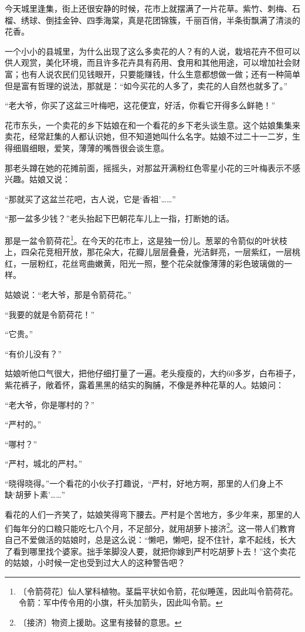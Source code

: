 \documentclass[12pt,UTF-8,openany]{ctexbook}
\begin{document}
\begin{large}
    
    今天城里逢集，街上还很安静的时候，花市上就摆满了一片花草。紫竹、刺梅、石榴、绣球、倒挂金钟、四季海棠，真是花团锦簇，千丽百俏，半条街飘满了清淡的花香。
    
    一个小小的县城里，为什么出现了这么多卖花的人？有的人说，栽培花卉不但可以供人观赏，美化环境，而且许多花卉具有药用、食用和其他用途，可以增加社会财富；也有人说农民们见钱眼开，只要能赚钱，什么生意都想做一做；还有一种简单但是富有哲理的说法，那就是：“如今买花的人多了，卖花的人自然也就多了。”
    
    “老大爷，你买了这盆三叶梅吧，这花便宜，好活，你看它开得多么鲜艳！”
    
    花市东头，一个卖花的乡下姑娘在和一个看花的乡下老头谈生意。这个姑娘集集来卖花，经常赶集的人都认识她，但不知道她叫什么名字。姑娘不过二十一二岁，生得细眉细眼，爱笑，薄薄的嘴唇很会谈生意。
    
    那老头蹲在她的花摊前面，摇摇头，对那盆开满粉红色零星小花的三叶梅表示不感兴趣。姑娘又说：
    
    “那就买了这盆兰花吧，古人说，它是‘香祖’……”
    
    “那一盆多少钱？”老头抬起下巴朝花车儿上一指，打断她的话。
    
    那是一盆令箭荷花\footnote{〔令箭荷花〕仙人掌科植物。茎扁平状如令箭，花似睡莲，因此叫令箭荷花。令箭：军中传令用的小旗，杆头加箭头，因此叫令箭。}。在今天的花市上，这是独一份儿。葱翠的令箭似的叶状枝上，四朵花竞相开放，那花朵大，花瓣儿层层叠叠，光洁鲜亮，一层紫红，一层桃红，一层粉红，花丝弯曲嫩黄，阳光一照，整个花朵就像薄薄的彩色玻璃做的一样。
    
    姑娘说：“老大爷，那是令箭荷花。”
    
    “我要的就是令箭荷花！”
    
    “它贵。”
    
    “有价儿没有？”
    
    姑娘听他口气很大，把他仔细打量了一遍。老头瘦瘦的，大约60多岁，白布褂子，紫花裤子，敞着怀，露着黑黑的结实的胸脯，不像是养种花草的人。姑娘问：
    
    “老大爷，你是哪村的？”
    
    “严村的。”
    
    “哪村？”
    
    “严村，城北的严村。”
    
    “晓得晓得。”一个看花的小伙子打趣说，“严村，好地方啊，那里的人们身上不缺‘胡萝卜素’……”
    
    看花的人们一齐笑了，姑娘笑得弯下腰去。严村是个苦地方，多少年来，那里的人们每年分的口粮只能吃七八个月，不足部分，就用胡萝卜接济\footnote{〔接济〕物资上援助。这里有接替的意思。}。这一带人们教育自己不爱做活的姑娘时，总是这么说：“懒吧，懒吧，捉不住针，拿不起线，长大了看到哪里找个婆家。拙手笨脚没人要，就把你嫁到严村吃胡萝卜去！”这个卖花的姑娘，小时候一定也受到过大人的这种警告吧？
    

\end{large}
\end{document}
